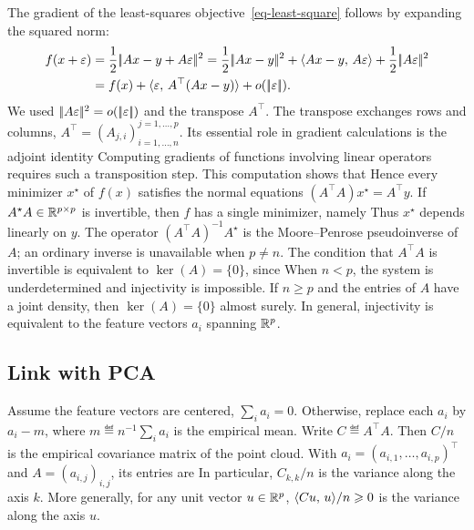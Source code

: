 The gradient of the least-squares objective~\eqref{eq-least-square} follows by expanding the squared norm:
\begin{align*}
	f(x+\epsilon) &= \frac{1}{2}\norm{Ax-y+A\epsilon}^2 = \frac12\norm{Ax-y}^2+\dotp{Ax-y}{A\epsilon} + \frac{1}{2}\norm{A\epsilon}^2 \\
		&=f(x) + \dotp{\epsilon}{A^\top(Ax-y)} + o(\norm{\epsilon}).
\end{align*} 
We used $|\!| A\varepsilon |\!|^2 = o(|\!| \varepsilon |\!|)$ and the transpose $A^\top$.
%
The transpose exchanges rows and columns, $A^\top = (A_{j,i})_{i=1,\ldots,n}^{j=1,\ldots,p}$. Its essential role in gradient calculations is the adjoint identity
Computing gradients of functions involving linear operators requires such a transposition step.
%
This computation shows that
Hence every minimizer $x^\star$ of $f(x)$ satisfies the normal equations $(A^\top A) x^\star = A^\top y$.
%
If $A^\star A \in \mathbb{R}^{p \times p}$ is invertible, then $f$ has a single minimizer, namely  
Thus $x^\star$ depends linearly on $y$. The operator $(A^\top A)^{-1} A^\star$ is the Moore--Penrose pseudoinverse of $A$; an ordinary inverse is unavailable when $p \neq n$.
%
The condition that $A^\top A$ is invertible is equivalent to $\ker(A)=\{0\}$, since 
When $n<p$, the system is underdetermined and injectivity is impossible. If $n\geq p$ and the entries of $A$ have a joint density, then $\ker(A)=\{0\}$ almost surely. In general, injectivity is equivalent to the feature vectors $a_i$ spanning $\mathbb{R}^p$.
 
\subsection{Link with PCA}

Assume the feature vectors are centered, $\sum_i a_i=0$. Otherwise, replace each $a_i$ by $a_i-m$, where $m\eqdef n^{-1}\sum_i a_i$ is the empirical mean. Write $C\eqdef A^\top A$. Then $C/n$ is the empirical covariance matrix of the point cloud. With $a_i=(a_{i,1},\ldots,a_{i,p})^\top$ and $A=(a_{i,j})_{i,j}$, its entries are
 In particular, $C_{k,k}/n$ is the variance along the axis $k$. More generally, for any unit vector $u \in \mathbb{R}^p$, $\langle C u,\,u\rangle/n \geqslant 0$ is the variance along the axis $u$.
 
